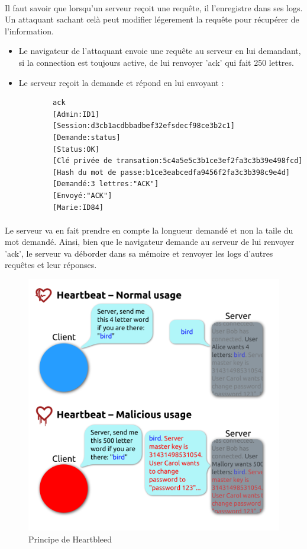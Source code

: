 \paragraph{}
Il faut savoir que lorsqu'un serveur reçoit une requête, il l'enregistre dans ses logs. Un attaquant sachant celà peut modifier légerement la requête pour récupérer de l'information.
\begin{itemize}
  \item Le navigateur de l'attaquant envoie une requête au serveur en lui demandant, si la connection est toujours active, de lui renvoyer 'ack' qui fait 250 lettres.
  \item Le serveur reçoit la demande et répond en lui envoyant :
	\begin{verbatim}
		ack
		[Admin:ID1]
		[Session:d3cb1acdbbadbef32efsdecf98ce3b2c1]
		[Demande:status]
		[Status:OK]
		[Clé privée de transation:5c4a5e5c3b1ce3ef2fa3c3b39e498fcd]
		[Hash du mot de passe:b1ce3eabcedfa9456f2fa3c3b398c9e4d]
		[Demandé:3 lettres:"ACK"]
		[Envoyé:"ACK"]
		[Marie:ID84]
	\end{verbatim}
\end{itemize}

\paragraph{}
Le serveur va en fait prendre en compte la longueur demandé et non la taile du mot demandé. Ainsi, bien que le navigateur demande au serveur de lui renvoyer 'ack', le serveur va déborder dans sa mémoire et renvoyer les logs d'autres requêtes et leur réponses.\\

\begin{figure}[h]
\label{fig:Principe de Heartbleed}
\centering
\includegraphics[scale=0.2]{Heartbleed}
\caption{Principe de Heartbleed}
\end{figure}

